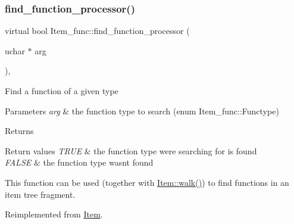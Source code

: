 \mbox{\label{classItem__func_a0aeb033ca165677743782518419b71ac}} 
\subsubsection{\texorpdfstring{find\+\_\+function\+\_\+processor()}{find\_function\_processor()}}
{\footnotesize\ttfamily virtual bool Item\+\_\+func\+::find\+\_\+function\+\_\+processor (\begin{DoxyParamCaption}\item[{uchar $\ast$}]{arg }\end{DoxyParamCaption})\hspace{0.3cm}{\ttfamily [inline]}, {\ttfamily [virtual]}}

Find a function of a given type


\begin{DoxyParams}{Parameters}
{\em arg} & the function type to search (enum Item\+\_\+func\+::\+Functype) \\
\hline
\end{DoxyParams}
\begin{DoxyReturn}{Returns}

\end{DoxyReturn}

\begin{DoxyRetVals}{Return values}
{\em T\+R\+UE} & the function type we\textquotesingle{}re searching for is found \\
\hline
{\em F\+A\+L\+SE} & the function type wasn\textquotesingle{}t found\\
\hline
\end{DoxyRetVals}
This function can be used (together with \mbox{\hyperlink{classItem_ab7d2529511c14a77e59a1b1bbabc95d7}{Item\+::walk()}}) to find functions in an item tree fragment. 

Reimplemented from \mbox{\hyperlink{classItem_a8aefc8bd78c2530c57e0fda53063c99d}{Item}}.

\mbox{\label{classItem__func_ab2b8cc7a3bf580679718da7e99e3e8d9}} 
